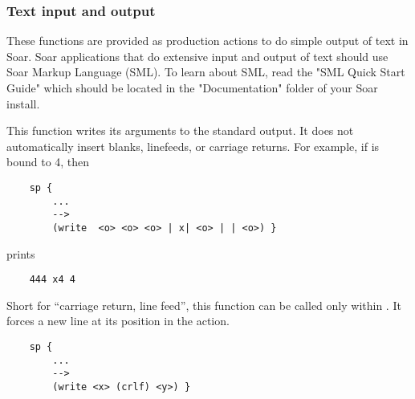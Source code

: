 \subdivider
\subsubsection*{Text input and output}

These functions are provided as production actions to do simple output of text in Soar. Soar applications that do extensive input and output of text should use Soar Markup Language (SML). To learn about SML, read the "SML Quick Start Guide" which should be located in the "Documentation"  folder of your Soar install.


\begin{description}

\item [\soarb{write} --- ]
	This function writes its arguments to the standard output. It does not automatically insert blanks, linefeeds, or carriage returns.  For example, if  is bound to 4, then

	\begin{verbatim}
	sp {
	    ...
	    -->
	    (write  <o> <o> <o> | x| <o> | | <o>) }
	\end{verbatim}

	prints

	\begin{verbatim}
	444 x4 4
	\end{verbatim}

\item [\soarb{crlf} --- ]
	Short for ``carriage return, line feed'', this function can be called only within . It forces a new line at its position in the  action.

	\begin{verbatim}
	sp {
	    ...
	    -->
	    (write <x> (crlf) <y>) }
	\end{verbatim}




\end{description}
